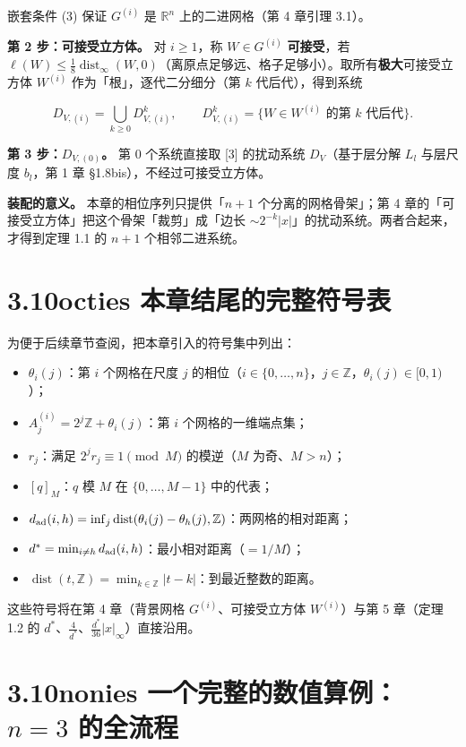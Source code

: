 \documentclass[a4paper,11pt,openany]{ctexbook}
\numberwithin{equation}{chapter}
\numberwithin{figure}{chapter}
\numberwithin{table}{chapter}
\begin{document}
嵌套条件 (3) 保证 $G^{(i)}$ 是 $\mathbb R^n$ 上的二进网格（第 4 章引理 3.1）。

\textbf{第 2 步：可接受立方体。} 对 $i\ge1$，称 $W\in G^{(i)}$ \textbf{可接受}，若 $\ell(W)\le\frac18\operatorname{dist}_\infty(W,0)$（离原点足够远、格子足够小）。取所有\textbf{极大}可接受立方体 $W^{(i)}$ 作为「根」，逐代二分细分（第 $k$ 代后代），得到系统

$$D_{V,(i)}=\bigcup_{k\ge0}D_{V,(i)}^k,\qquad D_{V,(i)}^k=\{\text{$W\in W^{(i)}$ 的第 $k$ 代后代}\}.$$

\textbf{第 3 步：$D_{V,(0)}$。} 第 $0$ 个系统直接取 [3] 的扰动系统 $D_V$（基于层分解 $L_l$ 与层尺度 $b_l$，第 1 章 §1.8bis），不经过可接受立方体。

\textbf{装配的意义。} 本章的相位序列只提供「$n+1$ 个分离的网格骨架」；第 4 章的「可接受立方体」把这个骨架「裁剪」成「边长 $\sim2^{-k}|x|$」的扰动系统。两者合起来，才得到定理 1.1 的 $n+1$ 个相邻二进系统。

\section{3.10octies 本章结尾的完整符号表}

为便于后续章节查阅，把本章引入的符号集中列出：

\begin{itemize}
\item $\theta_i(j)$：第 $i$ 个网格在尺度 $j$ 的相位（$i\in\{0,\dots,n\}$，$j\in\mathbb Z$，$\theta_i(j)\in[0,1)$）；
\item $A_j^{(i)}=2^j\mathbb Z+\theta_i(j)$：第 $i$ 个网格的一维端点集；
\item $r_j$：满足 $2^j r_j\equiv1\pmod M$ 的模逆（$M$ 为奇、$M>n$）；
\item $[q]_M$：$q$ 模 $M$ 在 $\{0,\dots,M-1\}$ 中的代表；
\item $d_{\rm ad}(i,h)=\inf_j\operatorname{dist}(\theta_i(j)-\theta_h(j),\mathbb Z)$：两网格的相对距离；
\item $d^*=\min_{i\neq h}d_{\rm ad}(i,h)$：最小相对距离（$=1/M$）；
\item $\operatorname{dist}(t,\mathbb Z)=\min_{k\in\mathbb Z}|t-k|$：到最近整数的距离。
\end{itemize}

这些符号将在第 4 章（背景网格 $G^{(i)}$、可接受立方体 $W^{(i)}$）与第 5 章（定理 1.2 的 $d^*$、$\frac4{d^*}$、$\frac{d^*}{36}|x|_\infty$）直接沿用。

\section{3.10nonies 一个完整的数值算例：$n=3$ 的全流程}
\end{document}
